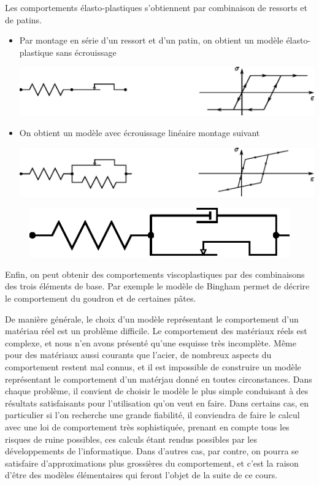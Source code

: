 Les comportements élasto-plastiques s'obtiennent par combinaison de ressorts et de patins.
\begin{itemize}
    \item Par montage en série d'un ressort et d'un patin, on obtient un modèle élasto-plastique sans écrouissage
        \begin{center}
            \includegraphics{../images/T1_Ch04-0028}
        \end{center}
    \item On obtient un modèle avec écrouissage linéaire montage suivant
        \begin{center}
            \includegraphics{../images/T1_Ch04-0029}
        \end{center}
\end{itemize}

\begin{figure}
    \begin{center}
        \includegraphics{../images/T1_Ch04-0030}
    \end{center}
\end{figure}
Enfin, on peut obtenir des comportements viscoplastiques par des combinaisons des trois éléments de base.
Par exemple le modèle de Bingham permet de décrire le comportement du goudron et de certaines pâtes.

De manière générale, le choix d'un modèle représentant le comportement d'un matériau réel est un problème difficile.
Le comportement des matériaux réels est complexe, et nous n'en avons présenté qu'une esquisse très  incomplète.
Même pour des matériaux aussi courants que l'acier, de nombreux aspects du comportement restent mal connus, et il est impossible de  construire un modèle représentant le comportement d'un matérjau donné en toutes circonstances.
Dans chaque problème, il convient de choisir le modèle le plus simple conduisant à des résultats satisfaisants pour l'utilisation qu'on veut en faire.
Dans certains cas, en particulier si l'on recherche une grande fiabilité, il conviendra de faire le calcul avec une loi de comportement très sophistiquée, prenant en compte tous les risques de ruine possibles, ces calculs étant rendus possibles par les développements de l'informatique.
Dans d'autres cas, par contre, on pourra se satisfaire d'approximations plus grossières du comportement, et c'est la raison d'être des modèles élémentaires qui feront l'objet de la suite de ce cours.

